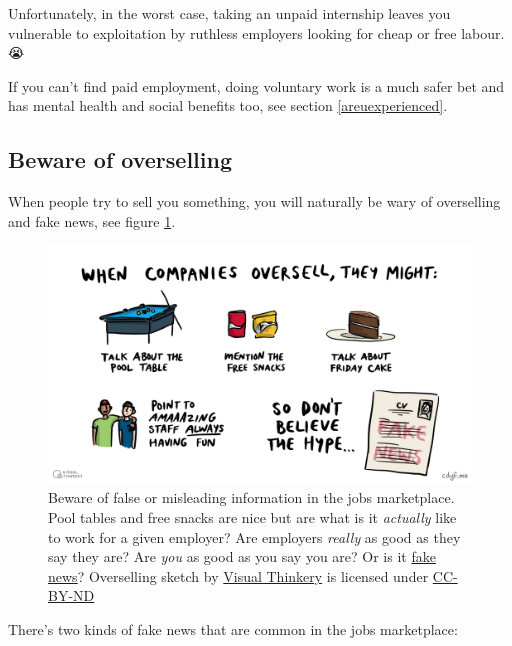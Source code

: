 \documentclass[
]{book}
\begin{document}
Unfortunately, in the worst case, taking an unpaid internship leaves you vulnerable to exploitation by ruthless employers looking for cheap or free labour. 😭

If you can't find paid employment, doing voluntary work is a much safer bet and has mental health and social benefits too, see section \ref{areuexperienced}.

\hypertarget{oversell}{%
\subsection{Beware of overselling}\label{oversell}}

When people try to sell you something, you will naturally be wary of overselling and fake news, see figure \ref{fig:fakenews-fig}.

\begin{figure}

{\centering \includegraphics[width=0.98\linewidth]{images/overselling} 

}

\caption{Beware of false or misleading information in the jobs marketplace. Pool tables and free snacks are nice but are what is it \emph{actually} like to work for a given employer? Are employers \emph{really} as good as they say they are? Are \emph{you} as good as you say you are? Or is it \href{https://en.wikipedia.org/wiki/Fake_news}{fake news}? Overselling sketch by \href{https://visualthinkery.com/}{Visual Thinkery} is licensed under \href{https://creativecommons.org/licenses/by-nd/4.0/}{CC-BY-ND}}\label{fig:fakenews-fig}
\end{figure}



There's two kinds of fake news that are common in the jobs marketplace:
\end{document}
